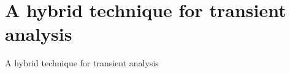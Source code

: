 
\section{A hybrid technique for transient analysis}
  \begin{frame}{A hybrid technique for transient analysis}
    
  \end{frame}
